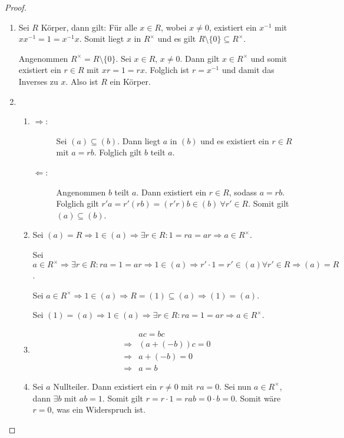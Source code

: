 \documentclass[12pt,a4paper]{scrartcl}
\begin{document}
\begin{proof}
	\leavevmode
	\begin{enumerate}
		\item Sei $R$ Körper, dann gilt: Für alle $x\in R$, wobei $x\neq 0$, existiert ein $x^{-1}$ mit $xx^{-1} = 1 =x^{-1}x$. Somit liegt $x$ in $R^{\times}$ und es gilt $R\setminus \{0\}\subseteq R^{\times}$.
		
		Angenommen $R^{\times} = R\setminus\{0\}$. Sei $x\in R$, $x\neq 0$. Dann gilt $x\in R^{\times}$ und somit existiert ein $r \in R$ mit $xr = 1 = rx$. Folglich ist $r = x^{-1}$ und damit das Inverses zu $x$. Also ist $R$ ein Körper.
		
		\item \begin{enumerate}
			\item 
				\begin{description}
					\item[\glqq $\Rightarrow$\grqq:] Sei $(a)\subseteq (b)$. Dann liegt $a$ in $(b)$ und es existiert ein $r\in R$ mit $a = rb$. Folglich gilt $b$ teilt $a$.
					
					\item[\glqq $\Leftarrow$\grqq:] Angenommen $b$ teilt $a$. Dann existiert ein $r\in R$, sodass $a =rb$. Folglich gilt $r'a = r'(rb) = (r'r)b\in (b)~\forall r'\in R$. Somit gilt $(a)\subseteq (b)$.
				\end{description}
				
			\item %
				Sei $(a) = R\Rightarrow 1\in (a)\Rightarrow \exists r\in R: 1 = ra = ar\Rightarrow a\in R^{\times}$.
			
				Sei $a\in R^{\times}\Rightarrow \exists r\in R: ra = 1 = ar\Rightarrow 1\in (a) \Rightarrow r'\cdot 1 = r'\in (a) \forall r'\in R \Rightarrow (a) = R$.
				
				Sei $a \in R^{\times}\Rightarrow 1\in (a) \Rightarrow R = (1) \subseteq (a) \Rightarrow (1)  = (a) $.
				
				Sei $(1) = (a) \Rightarrow1\in (a) \Rightarrow \exists r\in R: ra = 1 = ar\Rightarrow a\in R^{\times}$.
			\item 
				\begin{align*}
					&ac = bc \\
					\Rightarrow& (a+(-b))c = 0 \\
					\Rightarrow& a+(-b) = 0 \\
					\Rightarrow& a = b
				\end{align*}
			\item 
				Sei $a$ Nullteiler. Dann existiert ein $r\neq 0$ mit $ra = 0$. Sei nun $a\in R^{\times}$, dann $\exists b$ mit $ab = 1$. Somit gilt $r = r\cdot 1 = rab = 0 \cdot b = 0$. Somit wäre $r = 0$, was ein Widerspruch ist.
    \qedhere
		\end{enumerate}
	\end{enumerate}
\end{proof}
\end{document}

